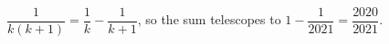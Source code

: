 $\dfrac1{k(k+1)}=\dfrac1k-\dfrac1{k+1}$, so the sum telescopes to $1-\dfrac1{2021}=\boxed{\dfrac{2020}{2021}}$.
